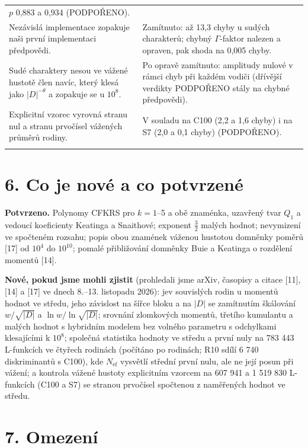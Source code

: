 \documentclass[
  10pt,
]{article}
\begin{document}
{\begin{longtable}[]{@{}
  >{\raggedright\arraybackslash}p{}
  >{\raggedright\arraybackslash}p{}@{}}
\(p\) 0,883 a 0,934 (PODPOŘENO). \\ \addlinespace[2pt]
Nezávislá implementace zopakuje naši první implementaci předpovědi. &
Zamítnuto: až 13,3 chyby u sudých charakterů; chybný \(\Gamma\)-faktor
nalezen a opraven, pak shoda na 0,005 chyby. \\ \addlinespace[2pt]
Sudé charaktery nesou ve vážené hustotě člen navíc, který klesá jako
\(|D|^{-\theta}\) a zopakuje se u \(10^8\). & Po opravě zamítnuto:
amplitudy nulové v rámci chyb při každém vodiči (dřívější verdikty
PODPOŘENO stály na chybné předpovědi). \\ \addlinespace[2pt]
Explicitní vzorec vyrovná stranu nul a stranu prvočísel vážených průměrů
rodiny. & V souladu na C100 (2,2 a 1,6 chyby) i na S7 (2,0 a 0,1 chyby)
(PODPOŘENO). \\ \addlinespace[2pt]
\end{longtable}}

\hypertarget{co-je-novuxe9-a-co-potvrzenuxe9}{%
\section{6. Co je nové a co
potvrzené}\label{co-je-novuxe9-a-co-potvrzenuxe9}}

\textbf{Potvrzeno.} Polynomy CFKRS pro \(k = 1\)--5 a obě znaménka,
uzavřený tvar \(Q_1\) a vedoucí koeficienty Keatinga a Snaithové;
exponent \(\tfrac32\) malých hodnot; nevymizení ve spočteném rozsahu;
popis obou znamének váženou hustotou domněnky poměrů {[}17{]} od
\(10^4\) do \(10^{10}\); pomalé přibližování domněnky Buie a Keatinga o
rozdělení momentů {[}14{]}.

\textbf{Nové, pokud jsme mohli zjistit} (prohledali jsme arXiv, časopisy
a citace {[}11{]}, {[}14{]} a {[}17{]} ve dnech 8.--13. listopadu 2026):
jev souvislých rodin u momentů hodnot ve středu, jeho závislost na šířce
bloku a na \(|D|\) se zamítnutím škálování \(w/\sqrt{|D|}\) a
\(\ln w/\ln\sqrt{|D|}\); srovnání zlomkových momentů, třetího kumulantu
a malých hodnot s hybridním modelem bez volného parametru s odchylkami
klesajícími k \(10^8\); společná statistika hodnoty ve středu a první
nuly na 783 443 L-funkcích ve čtyřech rodinách (počítáno po rodinách;
R10 sdílí 6 740 diskriminantů s C100), kde \(N_{\mathrm{ef}}\) vysvětlí
střední první nulu, ale ne její posun při vážení; a kontrola vážené
hustoty explicitním vzorcem na 607 941 a 1 519 830 L-funkcích (C100 a
S7) se stranou prvočísel spočtenou z naměřených hodnot ve středu.

\hypertarget{omezenuxed}{%
\section{7. Omezení}\label{omezenuxed}}
\end{document}
